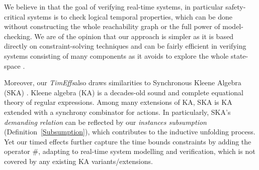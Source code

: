 \documentclass[acmsmall,10pt,review]{acmart}
\newcommand{\timedEffects}{\emph{TimEffs}}
\newcommand{\code}[1]{{\tt{\ensuremath{\m{#1}}}}}
\newcommand{\m}{\mathit}
\newcommand\defref[1]{Definition~\textcolor{blue}{\ref{#1}}}
\begin{document}
We believe in that the goal of verifying real-time systems, in particular safety-critical systems is to check logical temporal properties, which can be done without constructing the whole reachability graph or the full power of model-checking. We are of the opinion that our approach is simpler as it is based directly on constraint-solving techniques and can be fairly efficient in verifying systems consisting of many components as it avoids to explore the whole state-space \cite{song2020automated,yi1995automatic}.


Moreover, our \timedEffects also draws similarities to Synchronous Kleene Algebra (SKA) \cite{prisacariu2010synchronous}. 
Kleene algebra (KA) is a decades-old sound and complete equational theory of regular expressions. Among many extensions of KA,
  SKA is KA extended with a synchrony combinator for actions. In particularly, SKA's \emph{demanding relation} can be reflected by our \emph{instances subsumption} (\defref{Subsumption}), which contributes to the inductive unfolding process. 
Yet our timed effects further capture the time bounds constraints by adding the operator \code{\#}, adapting to real-time system modelling and verification, which is not covered by any existing KA variants/extensions. 



\end{document}
